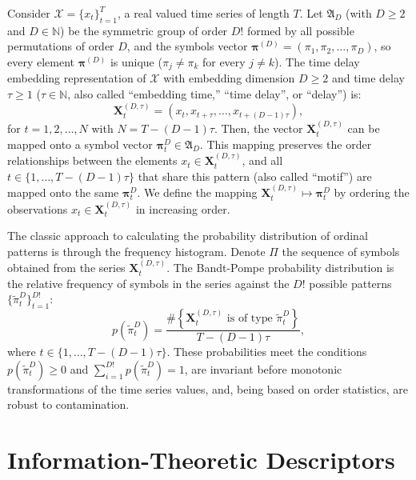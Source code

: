 \documentclass[a4,11pt]{pssbmac}
\begin{document}
Consider ${\mathcal X} = \{x_t\}_{t=1}^{T}$, a real valued time series of length $T$. 
Let ${\mathfrak A}_{D}$ (with $D \geq 2$ and $D \in {\mathbb  N}$) be the symmetric group of order $D!$ formed by all 
possible permutations of order $D$, and the symbols  vector 
${\bm \pi}^{(D)} = (\pi_1, \pi_2, \dots, \pi_D)$, so every element ${\bm \pi}^{(D)}$ is unique 
($\pi_j \neq \pi_k$ for every $j \neq k$). 
The time delay embedding representation of ${\mathcal X}$
with embedding dimension $D \geq 2$ and time delay $\tau \geq 1$ ($\tau \in {\mathbb  N}$, also called ``embedding time,'' ``time delay'', or ``delay'') is:
\begin{equation} 
	{\mathbf X}^{(D,\tau)}_t =( x_t,x_{t+\tau},\dots,x_{t+(D-1)\tau} ) ,
	\label{eq:time-delay}
\end{equation} 
for $t = 1,2,\dots,N$ with $N = T-(D-1) \tau$.
Then, the vector ${\mathbf X}^{(D,\tau)}_t$ can be mapped onto a symbol vector ${\bm \pi}_t^D \in {\mathfrak A}_{D}$. 
This mapping preserves the order relationships between the elements 
$x_t  \in {\mathbf X}^{(D,\tau)}_t$, and all $t \in \{1,\dots,T-(D-1)\tau\}$ that share this pattern (also called ``motif'') are mapped onto the same 
${\bm \pi}_t^{D}$.
We define the mapping ${\mathbf X}_t^{(D,\tau)} \mapsto {\mathbf \pi}_t^{D}$ by ordering the observations $x_t \in {\mathbf X}_t^{(D,\tau)}$ in increasing order.

The classic approach to calculating the probability distribution of ordinal patterns is through the frequency histogram.
Denote $\Pi$ the sequence of symbols obtained from the series $\mathbf{X}_t^{(D,\tau)}$.
The Bandt-Pompe probability distribution is the relative frequency of symbols in the series against the $D!$ possible patterns $\{\widetilde\pi_t^D \}_{t = 1}^{D!}$:
\begin{equation}
	p(\widetilde\pi_t^D) = \frac{\#\left \{\mathbf{X}_t^{(D,\tau)} \text{ is of type } \widetilde\pi_t^D\right \}}{T- (D-1)\tau},  
\end{equation}
where  $t\in \{1, \dots, T-(D-1)\tau\}$.
These probabilities meet the conditions $p(\widetilde\pi_t^D) \ge 0$ and  $\sum_{i=1}^{D!} p(\widetilde\pi_t^D) = 1$, are invariant before monotonic transformations of the time series values, and, being based on order statistics, are robust to contamination.

\section{Information-Theoretic Descriptors}\label{HC}
\end{document}
